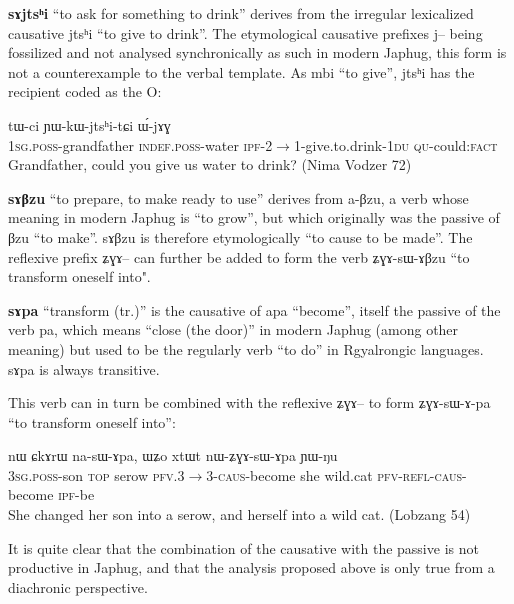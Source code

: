 \documentclass[oldfontcommands,oneside,a4paper,11pt]{article}
\newcommand{\ipa}[1]{{\phon \mbox{#1}}} %
\newcommand{\sg}{\textsc{sg}}
\newcommand{\pfv}{\textsc{pfv}}
\newcommand{\caus}{\textsc{caus}}
\newcommand{\du}{\textsc{du}}
\newcommand{\ipf}{\textsc{ipf}}
\newcommand{\fact}{\textsc{fact}}
\newcommand{\poss}{\textsc{poss}}
\newcommand{\qu}{\textsc{qu}}
\newcommand{\refl}{\textsc{refl}}
\newcommand{\topic}{\textsc{top}}
\begin{document}
    \textbf{\ipa{sɤjtsʰi}} ``to ask for something to drink'' derives from the irregular lexicalized causative \ipa{jtsʰi} ``to give to drink''. The etymological causative prefixes \ipa{j}-- being fossilized and not analysed synchronically as such in modern Japhug, this form is not a counterexample to the verbal template. As \ipa{mbi} ``to give'', \ipa{jtsʰi} has the recipient coded as the O:
      \begin{exe}
\ex
\gll   \ipa{a-wɯ} 	\ipa{tɯ-ci} 	\ipa{ɲɯ-kɯ-jtsʰi-tɕi} 	\ipa{ɯ́-jɤɣ}  \\
1\sg{}.\poss{}-grandfather \textsc{indef.poss}-water \ipf{}-2$\rightarrow$1-give.to.drink-1\du{} \qu{}-could:\fact{} \\
 \glt Grandfather, could you give us water to drink? (Nima Vodzer 72)
\end{exe}   
 
  
  \textbf{\ipa{sɤβzu}} ``to prepare, to make ready to use'' derives from \ipa{a-βzu}, a verb whose meaning in modern Japhug is ``to grow'', but which originally was the passive of \ipa{βzu} ``to make''. \ipa{sɤβzu}  is therefore etymologically ``to cause to be made''.   The reflexive prefix \ipa{ʑɣɤ}-- can further be added to form the verb \ipa{ʑɣɤ-sɯ-ɤβzu} ``to transform oneself into".

  \textbf{\ipa{sɤpa}} ``transform (tr.)'' is the causative of \ipa{apa} ``become'', itself the passive of the verb \ipa{pa}, which means ``close (the door)'' in modern Japhug (among other meaning) but used to be the  regularly verb ``to do'' in Rgyalrongic languages. \ipa{sɤpa} is always transitive.
  
  This verb can in turn be combined with the reflexive \ipa{ʑɣɤ}-- to form \ipa{ʑɣɤ-sɯ-ɤ-pa} ``to transform oneself into'':
  
  \begin{exe}
\ex
\gll \ipa{ɯ-tɕɯ} 	\ipa{nɯ} 	\ipa{ɕkɤrɯ} 	\ipa{na-sɯ-ɤpa,} 	\ipa{ɯʑo} 	\ipa{xtɯt} 	\ipa{nɯ-ʑɣɤ-sɯ-ɤpa} 	\ipa{ɲɯ-ŋu} \\
3\sg{}.\poss{}-son \topic{} serow \pfv{}.3$\rightarrow$3-\caus{}-become she wild.cat \pfv{}-\refl{}-\caus{}-become \ipf{}-be\\
 \glt She changed her son into a serow, and herself into a wild cat.  (Lobzang 54)
\end{exe} 


It is quite clear that the combination of the causative with the passive is not productive in Japhug, and that the analysis proposed above is only true from a diachronic perspective. 
\end{document}
